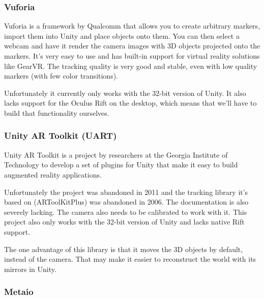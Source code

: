 			\subsubsection{Vuforia} \label{sssec:vuforia}
				Vuforia is a framework by Qualcomm that allows you to create
				arbitrary markers, import them into Unity and place objects onto
				them. You can then select a webcam and have it render the camera
				images with 3D objects projected onto the markers. It's very
				easy to use and has built-in support for virtual reality
				solutions like GearVR. The tracking quality is very good and
				stable, even with low quality markers (with few color transitions).

				Unfortunately it currently only works with the 32-bit version of
				Unity. It also lacks support for the Oculus Rift on the desktop,
				which means that we'll have to build that functionality ourselves.

			\subsubsection{Unity AR Toolkit (UART)} \label{sssec:uart}
				Unity AR Toolkit \cite{uart} is a project by researchers at the
				Georgia Institute of Technology to develop a set of plugins for
				Unity that make it easy to build augmented reality applications.

				Unfortunately the project was abandoned in 2011 and the tracking
				library it's based on (ARToolKitPlus) was abandoned in 2006. The
				documentation is also severely lacking. The camera also needs to
				be calibrated to work with it. This project also only works with
				the 32-bit version of Unity and lacks native Rift support.

				The one advantage of this library is that it moves the 3D
				objects by default, instead of the camera. That may make it
				easier to reconstruct the world with its mirrors in Unity.

			\subsubsection{Metaio} \label{sssec:metaio}


